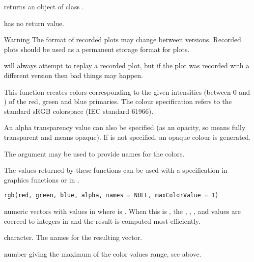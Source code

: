 %
\begin{Value}
 returns an object of class .

 has no return value.
\end{Value}
%
\begin{Section}{Warning}
The format of recorded plots may change between \R{} versions.
Recorded plots should  be used as a permanent
storage format for \R{} plots.

\R{} will always attempt to replay a recorded plot, but if the plot was 
recorded with a different \R{} version then bad things may happen.
\end{Section}
%
\begin{Description}\relax
This function creates colors corresponding to the given
intensities (between 0 and ) of the red, green and blue
primaries.  The colour specification refers to the
standard sRGB colorspace (IEC standard 61966).

An alpha transparency value can also be specified (as an opacity, so
 means fully transparent and  means opaque).  If
 is not specified, an opaque colour is generated.

The  argument may be used to provide names for the
colors.

The values returned by these functions can be used with a
 specification in graphics functions or in .
\end{Description}
%
\begin{Usage}
\begin{verbatim}
rgb(red, green, blue, alpha, names = NULL, maxColorValue = 1)
\end{verbatim}
\end{Usage}
%
\begin{Arguments}
\begin{ldescription}
\item[\code{red, blue, green, alpha}] numeric vectors with values in \eqn{[0, M]}{}
where  is .  When this is , the
, , , and 
values are coerced to integers in  and the result is
computed most efficiently.
\item[\code{names}] character. The names for the resulting vector.
\item[\code{maxColorValue}] number giving the maximum of the color values
range, see above.
\end{ldescription}
\end{Arguments}
